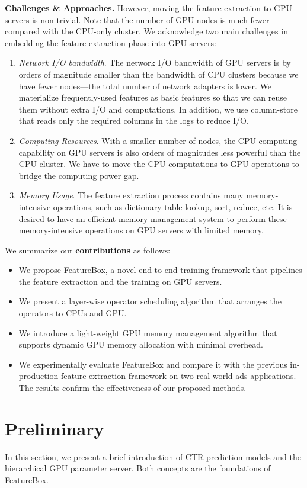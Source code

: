 \documentclass[conference]{IEEEtran}
\begin{document}
\textbf{Challenges \& Approaches.} 
However, moving the feature extraction to GPU servers is non-trivial. 
Note that the number of GPU nodes is much fewer compared with the CPU-only cluster. We acknowledge two main challenges in embedding the feature extraction phase into GPU servers:
\begin{enumerate}
\item {\it Network I/O bandwidth}. The network I/O bandwidth of GPU servers is by orders of magnitude smaller than the bandwidth of CPU clusters because we have fewer nodes---the total number of network adapters is lower. We materialize frequently-used features as basic features so that we can reuse them without extra I/O and computations. In addition, we use column-store that reads only the required columns in the logs to reduce I/O.
\item {\it Computing Resources}. With a smaller number of nodes, the CPU computing capability on GPU servers is also orders of magnitudes less powerful than the CPU cluster. We have to move the CPU computations to GPU operations to bridge the computing power gap.
\item {\it Memory Usage}. The feature extraction process contains many memory-intensive operations, such as dictionary table lookup, sort, reduce, etc. It is desired to have an efficient memory management system to perform these memory-intensive operations on GPU servers with limited memory.
\end{enumerate}

\newpage

We summarize our \textbf{contributions} as follows:
\begin{itemize}
\item We propose FeatureBox, a novel end-to-end training framework that pipelines the feature extraction and the training on GPU servers.
\item We present a layer-wise operator scheduling algorithm that arranges the operators to CPUs and GPU.
\item We introduce a light-weight GPU memory management algorithm that supports dynamic GPU memory allocation with minimal overhead.
\item We experimentally evaluate FeatureBox and compare it with the previous in-production feature extraction framework on two real-world ads applications. The results confirm the effectiveness of our proposed methods.
\end{itemize}

\section{Preliminary}
In this section, we present a brief introduction of CTR prediction models and the hierarchical GPU parameter server. Both concepts are the foundations of FeatureBox. 
\end{document}
